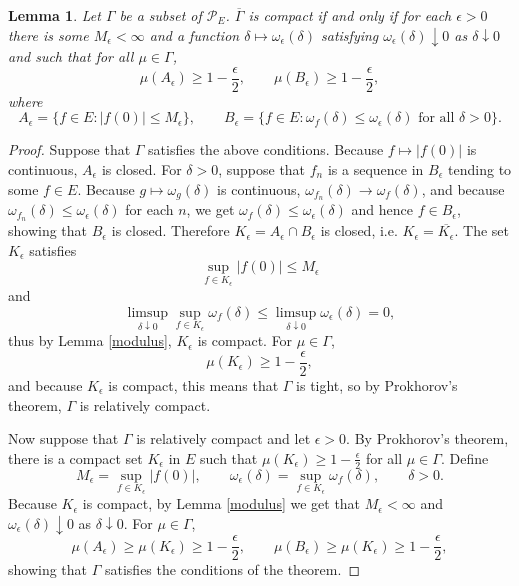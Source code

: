 \documentclass{article}
\newtheorem{lemma}[theorem]{Lemma}
\theoremstyle{definition}
\begin{document}
\begin{lemma}
Let $\Gamma$ be a subset of $\mathscr{P}_E$. $\overline{\Gamma}$ is compact if and only if for each $\epsilon>0$ there is some $M_\epsilon<\infty$ and a function
$\delta \mapsto \omega_\epsilon(\delta)$ satisfying $\omega_\epsilon(\delta) \downarrow 0$ as $\delta \downarrow 0$ and such that for all $\mu \in \Gamma$,
\[
\mu(A_\epsilon) \geq 1-\frac{\epsilon}{2},\qquad
\mu(B_\epsilon) \geq 1-\frac{\epsilon}{2},
\]
where
\[
A_\epsilon = \{f \in E : |f(0)| \leq M_\epsilon\},\qquad B_\epsilon = \{f \in E: \textrm{$\omega_f(\delta) \leq \omega_\epsilon(\delta)$ for all $\delta>0$}\}.
\]
\label{compactlemma}
\end{lemma}
\begin{proof}
Suppose that $\Gamma$ satisfies the above conditions. Because $f \mapsto |f(0)|$ is continuous, 
$A_\epsilon$ is closed. For $\delta>0$, suppose that $f_n$ is a sequence in $B_\epsilon$ tending
to some $f \in E$. Because $g \mapsto \omega_g(\delta)$ is continuous, $\omega_{f_n}(\delta)
\to \omega_f(\delta)$, and because $\omega_{f_n}(\delta) \leq \omega_\epsilon(\delta)$ for each
$n$, we get $\omega_f(\delta) \leq \omega_\epsilon(\delta)$ and hence $f \in B_\epsilon$, showing that
$B_\epsilon$ is closed. Therefore $K_\epsilon = A_\epsilon \cap B_\epsilon$ is closed, i.e.
$K_\epsilon = \overline{K_\epsilon}$. The set $K_\epsilon$ satisfies
\[
\sup_{f \in K_\epsilon} |f(0)| \leq M_\epsilon
\]
and
\[
\limsup_{\delta \downarrow 0} \sup_{f \in K_\epsilon} \omega_f(\delta)
\leq \limsup_{\delta \downarrow 0} \omega_\epsilon(\delta)
= 0,
\]
thus by Lemma \ref{modulus}, $K_\epsilon$ is compact.
For $\mu \in \Gamma$,
\[
\mu(K_\epsilon) \geq 1-\frac{\epsilon}{2},
\]
and because $K_\epsilon$ is compact, this means that $\Gamma$ is tight, so by
Prokhorov's theorem, $\Gamma$ is relatively compact. 

Now suppose that $\Gamma$ is relatively compact and let $\epsilon>0$. By Prokhorov's theorem,
there is a compact set $K_\epsilon$ in $E$ such that $\mu(K_\epsilon) \geq 1-\frac{\epsilon}{2}$ for all
$\mu \in \Gamma$. 
Define
\[
M_\epsilon = \sup_{f \in K_\epsilon} |f(0)|,
\qquad \omega_\epsilon(\delta) = \sup_{f \in K_\epsilon} \omega_f(\delta),\qquad \delta>0.
\]
Because $K_\epsilon$ is compact, by Lemma \ref{modulus} we get that 
$M_\epsilon<\infty$ and $\omega_\epsilon(\delta) \downarrow 0$ as $\delta \downarrow 0$. 
For $\mu \in \Gamma$, 
\[
\mu(A_\epsilon) \geq \mu(K_\epsilon) \geq 1-\frac{\epsilon}{2},
\qquad \mu(B_\epsilon) \geq \mu(K_\epsilon) \geq 1-\frac{\epsilon}{2},
\]
showing that $\Gamma$ satisfies the conditions of the theorem.
\end{proof}
\end{document}
